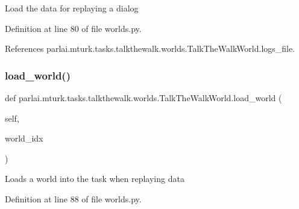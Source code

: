 \begin{DoxyVerb}Load the data for replaying a dialog\end{DoxyVerb}
 

Definition at line 80 of file worlds.\+py.



References parlai.\+mturk.\+tasks.\+talkthewalk.\+worlds.\+Talk\+The\+Walk\+World.\+logs\+\_\+file.

\mbox{\label{classparlai_1_1mturk_1_1tasks_1_1talkthewalk_1_1worlds_1_1TalkTheWalkWorld_aed8d5a0a3e3457f2334b33726912586c}} 
\subsubsection{\texorpdfstring{load\+\_\+world()}{load\_world()}}
{\footnotesize\ttfamily def parlai.\+mturk.\+tasks.\+talkthewalk.\+worlds.\+Talk\+The\+Walk\+World.\+load\+\_\+world (\begin{DoxyParamCaption}\item[{}]{self,  }\item[{}]{world\+\_\+idx }\end{DoxyParamCaption})}

\begin{DoxyVerb}Loads a world into the task when replaying data\end{DoxyVerb}
 

Definition at line 88 of file worlds.\+py.



